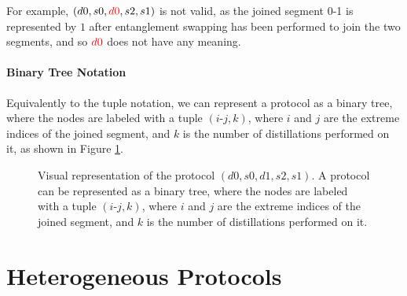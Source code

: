 \documentclass{article}
\begin{document}
For example, $(d0, s0, \textcolor{red}{d0}, s2, s1)$ is not valid, as the joined segment 0-1 is represented by $1$ after entanglement swapping has been performed to join the two segments, and so $\textcolor{red}{d0}$ does not have any meaning.

\paragraph*{Binary Tree Notation}

Equivalently to the tuple notation, we can represent a protocol as a binary tree, where the nodes are labeled with a tuple $(i\text{-}j, k)$, where $i$ and $j$ are the extreme indices of the joined segment, and $k$ is the number of distillations performed on it, as shown in Figure \ref{fig:binary_tree_notation}.

\begin{figure}[ht!]
  \centering
  \caption{Visual representation of the protocol $(d0, s0, d1, s2, s1)$. A protocol can be represented as a binary tree, where the nodes are labeled with a tuple $(i\text{-}j, k)$, where $i$ and $j$ are the extreme indices of the joined segment, and $k$ is the number of distillations performed on it.}
  \label{fig:binary_tree_notation}
\end{figure}

\clearpage
\section*{Heterogeneous Protocols}
\end{document}

